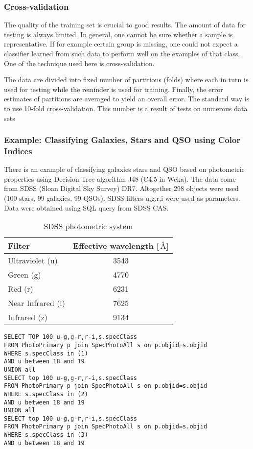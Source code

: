\subsubsection{Cross-validation}
The quality of the training set is crucial to good results. The amount
of data for testing is always limited. In general, one cannot be sure
whether a sample is representative. If for example certain group is
missing, one could not expect a classifier learned from such data to
perform well on the examples of that class. One of the technique used
here is cross-validation.

The data are divided into fixed number of partitions (folds) where
each in turn is used for testing while the reminder is used for
training. Finally, the error estimates of partitions are averaged to
yield an overall error. The standard way is to use 10-fold
cross-validation. This number is a result of tests on numerous data
sets \citep{witten2005data}

\subsubsection{Example: Classifying Galaxies, Stars and QSO using Color
Indices}

There is an example of classifying galaxies stars and QSO based on
photometric properties using Decision Tree algorithm J48 (C4.5 in
Weka). The data come from SDSS (Sloan Digital Sky Survey)
DR7. Altogether 298 objects were used (100 stars, 99 galaxies, 99
QSOs). SDSS filters u,g,r,i were used as parameters. Data were
obtained using SQL query from SDSS CAS.

\begin{table}[ht]
  \centering
  \small
     \begin{tabular}[ht]{l c}
     \toprule
     Filter & Effective wavelength [$\,\textrm{\AA}$] \\
     \midrule
     Ultraviolet (u) & 3543 \\
     Green (g) & 4770\\
     Red (r) & 6231\\
     Near Infrared (i) & 7625\\
     Infrared (z) & 9134 \\
     \bottomrule
   \end{tabular}
  \caption{SDSS photometric system \citep{fukugita1996sloan} }
  \label{tab:SDSSFilter}
\end{table}




\begin{lstlisting}
SELECT TOP 100 u-g,g-r,r-i,s.specClass
FROM PhotoPrimary p join SpecPhotoAll s on p.objid=s.objid 
WHERE s.specClass in (1)
AND u between 18 and 19
UNION all
SELECT top 100 u-g,g-r,r-i,s.specClass
FROM PhotoPrimary p join SpecPhotoAll s on p.objid=s.objid 
WHERE s.specClass in (2)
AND u between 18 and 19
UNION all
SELECT top 100 u-g,g-r,r-i,s.specClass
FROM PhotoPrimary p join SpecPhotoAll s on p.objid=s.objid 
WHERE s.specClass in (3)
AND u between 18 and 19
\end{lstlisting}

